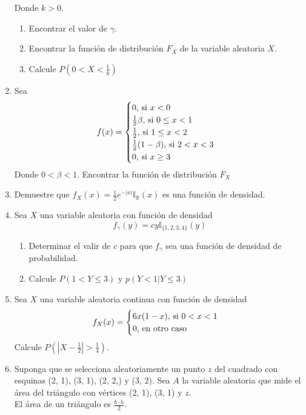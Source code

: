 \documentclass[12pt,a4paper]{report}
\begin{document}
\begin{enumerate}
{		Donde $k > 0$.
		\begin{enumerate}
			\item {
				Encontrar el valor de $\gamma$.
			}
			\item {
				Encontrar la función de distribución $F_X$ de la variable aleatoria
				$X$.
			}
			\item {
				Calcule $P(0 < X < \frac{1}{k})$
			}
		\end{enumerate}
		}
		\item {
			Sea
			\[
				f(x) = \begin{cases}
								0, $ si $ x < 0\\
								\frac{1}{2}\beta, $ si $ 0 \leq x < 1\\
								\frac{1}{2}, $ si $ 1 \leq x < 2\\
								\frac{1}{2}(1-\beta), $ si $ 2 < x < 3\\
								0, $ si $ x \geq 3
						 	 \end{cases}
			\]
			Donde $0 < \beta < 1$. Encontrar la función de distribución $F_X$
		}
		\item {
			Demuestre que $f_X(x) = \frac{1}{2}e^{-|x|}\mathbb{I}_\mathbb{R}(x)$ es
			una función de densidad.
		}
		\item {
			Sea $X$ una variable aleatoria con función de densidad
				\[f_\gamma(y) = cy \mathbb{I}_{\{1, 2, 3, 4\}}(y)\]
				\begin{enumerate}
					\item {
						Determinar el valir de $c$ para que $f_\gamma$ sea una función de
						densidad de probabilidad.
					}
					\item {
						Calcule $P(1 < Y \leq 3)$ y $p(Y < 1 | Y \leq 3)$
					}
				\end{enumerate}
		}
		\item {
			Sea $X$ una variable aleatoria continua con función de densidad
				\[
					f_X(x) = \begin{cases}
										6x(1-x), $ si $ 0 < x < 1\\
										0, $ en otro caso$
									 \end{cases}
				\]
			Calcule $P(|X-\frac{1}{2}| > \frac{1}{4})$.
		}
		\item {
			Suponga que se selecciona aleatoriamente un punto $z$ del cuadrado con
			esquinas (2, 1), (3, 1), (2, 2,) y (3, 2). Sea $A$ la variable aleatoria
			que mide el área del triángulo con vértices (2, 1), (3, 1) y $z$.\\
			El área de un triángulo es $\frac{b\cdot h}{2}$. \\
}
\end{enumerate}
\end{document}
